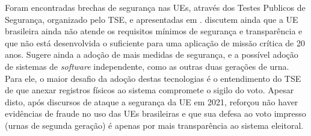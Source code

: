 \documentclass[portuguese]{textolivre}
\begin{document}
	
	
	
	
	Foram encontradas brechas de segurança nas UEs, através dos Testes Publicos de Segurança, organizado pelo TSE, e apresentadas em \textcite{aranha2013vulnerabilidades,aranha2019return}. \textcite{aranha2019return} discutem ainda que a UE brasileira ainda não atende os requisitos mínimos de segurança e transparência e que não está desenvolvida o suficiente para uma aplicação de missão crítica de 20 anos. Sugere ainda a adoção de mais medidas de segurança, e a possível adoção de sistemas de \emph{software} independente, como as outras duas gerações de urna. Para ele, o maior desafio da adoção destas tecnologias é o entendimento do TSE de que anexar registros físicos ao sistema compromete o sigilo do voto. Apesar disto, após discursos de ataque a segurança da UE em 2021, \textcite{aranha-2021} reforçou não haver evidências de fraude no uso das UEs brasileiras e que sua defesa ao voto impresso (urnas de segunda geração) é apenas por mais transparência ao sistema eleitoral.
	
		
\end{document}
